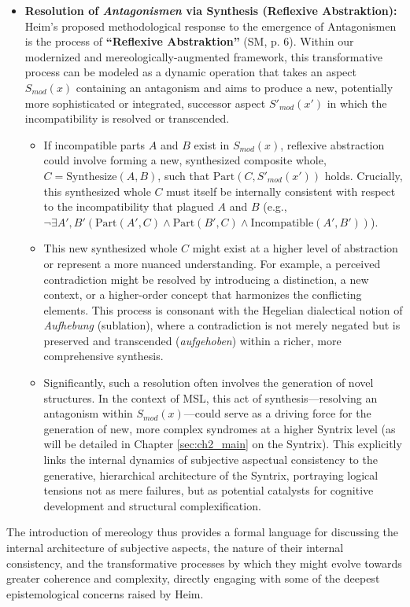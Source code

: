 \documentclass[
    12pt,              %
    a4paper,           %
    headings=normal,   %
    twoside=true,      %
    BCOR=8mm,          %
]{scrbook}
\newcommand{\q}[1]{\enquote{#1}}
\begin{document}
\begin{itemize}
    \item   \textbf{Resolution of \textit{Antagonismen} via Synthesis (Reflexive Abstraktion):}
        Heim’s proposed methodological response to the emergence of Antagonismen is the process of \textbf{\q{Reflexive Abstraktion}} (SM, p. 6). Within our modernized and mereologically-augmented framework, this transformative process can be modeled as a dynamic operation that takes an aspect \(S_{mod}(x)\) containing an antagonism and aims to produce a new, potentially more sophisticated or integrated, successor aspect \(S'_{mod}(x')\) in which the incompatibility is resolved or transcended.
        \begin{itemize}
            \item   If incompatible parts \(A\) and \(B\) exist in \(S_{mod}(x)\), reflexive abstraction could involve forming a new, synthesized composite whole, \(C = \text{Synthesize}(A,B)\), such that \(\text{Part}(C, S'_{mod}(x'))\) holds. Crucially, this synthesized whole \(C\) must itself be internally consistent with respect to the incompatibility that plagued \(A\) and \(B\) (e.g., \( \neg \exists A',B' (\text{Part}(A',C) \land \text{Part}(B',C) \land \text{Incompatible}(A',B')) \)).
            \item   This new synthesized whole \(C\) might exist at a higher level of abstraction or represent a more nuanced understanding. For example, a perceived contradiction might be resolved by introducing a distinction, a new context, or a higher-order concept that harmonizes the conflicting elements. This process is consonant with the Hegelian dialectical notion of \textit{Aufhebung} (sublation), where a contradiction is not merely negated but is preserved and transcended (\textit{aufgehoben}) within a richer, more comprehensive synthesis.
            \item   Significantly, such a resolution often involves the generation of novel structures. In the context of MSL, this act of synthesis—resolving an antagonism within \(S_{mod}(x)\)—could serve as a driving force for the generation of new, more complex syndromes at a higher Syntrix level (as will be detailed in Chapter \ref{sec:ch2_main} on the Syntrix). This explicitly links the internal dynamics of subjective aspectual consistency to the generative, hierarchical architecture of the Syntrix, portraying logical tensions not as mere failures, but as potential catalysts for cognitive development and structural complexification.
        \end{itemize}
\end{itemize}
The introduction of mereology thus provides a formal language for discussing the internal architecture of subjective aspects, the nature of their internal consistency, and the transformative processes by which they might evolve towards greater coherence and complexity, directly engaging with some of the deepest epistemological concerns raised by Heim.
\end{document}
